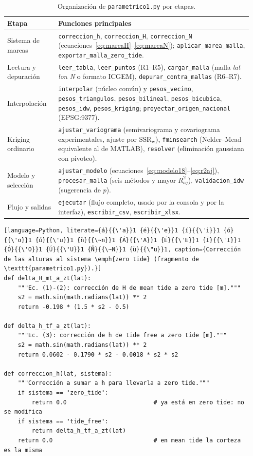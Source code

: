 \documentclass[11pt,letterpaper]{article}
\begin{document}
\begin{table}[H]
\centering
\caption{Organización de \texttt{parametrico1.py} por etapas.}
\label{tab:estructura_py}
\small
\renewcommand{\arraystretch}{1.15}
\begin{tabular}{@{}p{3.4cm}p{11.8cm}@{}}
\toprule
Etapa & Funciones principales \\
\midrule
Sistema de mareas & \texttt{correccion\_h}, \texttt{correccion\_H}, \texttt{correccion\_N}
(ecuaciones~\eqref{eq:mareaH}--\eqref{eq:mareaN}); \texttt{aplicar\_marea\_malla},
\texttt{exportar\_malla\_zero\_tide}. \\
Lectura y depuración & \texttt{leer\_tabla}, \texttt{leer\_puntos} (R1--R5),
\texttt{cargar\_malla} (malla \emph{lat lon N} o formato ICGEM), \texttt{depurar\_contra\_mallas} (R6--R7). \\
Interpolación & \texttt{interpolar} (núcleo común) y \texttt{pesos\_vecino},
\texttt{pesos\_triangulos}, \texttt{pesos\_bilineal}, \texttt{pesos\_bicubica},
\texttt{pesos\_idw}, \texttt{pesos\_kriging}; \texttt{proyectar\_origen\_nacional} (EPSG:9377). \\
Kriging ordinario & \texttt{ajustar\_variograma} (semivariograma y covariograma
experimentales, ajuste por $\mathrm{SSR_w}$), \texttt{fminsearch} (Nelder--Mead equivalente al de MATLAB),
\texttt{resolver} (eliminación gaussiana con pivoteo). \\
Modelo y selección & \texttt{ajustar\_modelo} (ecuaciones~\eqref{eq:modelo18}--\eqref{eq:r2aj}),
\texttt{procesar\_malla} (seis métodos y mayor $R^2_{aj}$), \texttt{validacion\_idw} (sugerencia de $p$). \\
Flujo y salidas & \texttt{ejecutar} (flujo completo, usado por la consola y por la interfaz),
\texttt{escribir\_csv}, \texttt{escribir\_xlsx}. \\
\bottomrule
\end{tabular}
\end{table}

\begin{lstlisting}[language=Python, literate={á}{{\'a}}1 {é}{{\'e}}1 {í}{{\'i}}1 {ó}{{\'o}}1 {ú}{{\'u}}1 {ñ}{{\~n}}1 {Á}{{\'A}}1 {É}{{\'E}}1 {Í}{{\'I}}1 {Ó}{{\'O}}1 {Ú}{{\'U}}1 {Ñ}{{\~N}}1 {ü}{{\"u}}1, caption={Corrección de las alturas al sistema \emph{zero tide} (fragmento de \texttt{parametrico1.py}).}]
def delta_H_mt_a_zt(lat):
    """Ec. (1)-(2): corrección de H de mean tide a zero tide [m]."""
    s2 = math.sin(math.radians(lat)) ** 2
    return -0.198 * (1.5 * s2 - 0.5)

def delta_h_tf_a_zt(lat):
    """Ec. (3): corrección de h de tide free a zero tide [m]."""
    s2 = math.sin(math.radians(lat)) ** 2
    return 0.0602 - 0.1790 * s2 - 0.0018 * s2 * s2

def correccion_h(lat, sistema):
    """Corrección a sumar a h para llevarla a zero tide."""
    if sistema == 'zero_tide':
        return 0.0                         # ya está en zero tide: no se modifica
    if sistema == 'tide_free':
        return delta_h_tf_a_zt(lat)
    return 0.0                             # en mean tide la corteza es la misma
\end{lstlisting}
\end{document}
